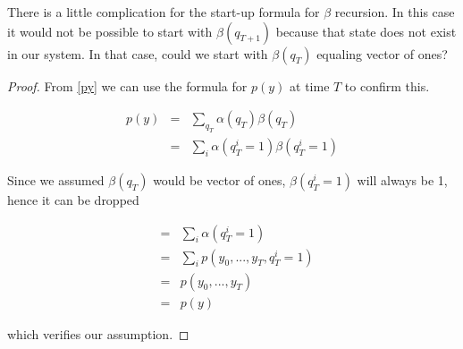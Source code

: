 There is a little complication for the start-up formula for $\beta$
recursion. In this case it would not be possible to start with $\beta(q_{T+1})$
because that state does not exist in our system. In that case, could we start
with $\beta(q_T)$ equaling vector of ones?

\begin{proof}
From \eqref{py} we can use the formula for $p(y)$ at time $T$ to confirm this. 

\begin{eqnarray*}
p(y) &=& \sum_{q_T} \alpha(q_T)\beta(q_T) \\
&=& \sum_{i} \alpha(q_T^i=1)\beta(q_T^i=1) 
\end{eqnarray*}

Since we assumed $\beta(q_T)$ would be vector of ones, $\beta(q_T^i=1)$ will
always be 1, hence it can be dropped

\begin{eqnarray*}
&=& \sum_{i} \alpha(q_T^i=1)\\
&=& \sum_{i} p(y_0,...,y_T,q_T^i=1)\\
&=& p(y_0,...,y_T)\\
&=& p(y)
\end{eqnarray*}

which verifies our assumption.
\end{proof}
